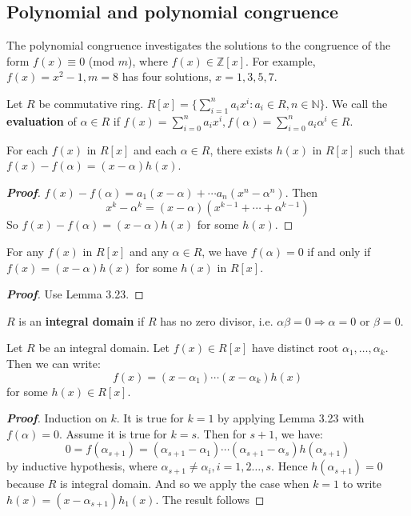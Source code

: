 \subsection{Polynomial and polynomial congruence}
The polynomial congruence investigates the solutions to the congruence of the form $f(x) \equiv 0$ (mod $m$), where $f(x) \in \mathbb{Z}[x]$. For example, $f(x)=x^2-1,m=8$ has four solutions, $x=1,3,5,7$.
\begin{definition} Let $R$ be commutative ring. $R[x]=\{\sum_{i=1}^{n}a_ix^i: a_i \in R, n \in \mathbb{N}\}$. We call the {\bf evaluation} of $\alpha \in R$ if $f(x)=\sum_{i=0}^n a_ix^i, f(\alpha)=\sum_{i=0}^{n}a_i \alpha^i \in R$.
\end{definition}
\begin{lemma} For each $f(x)$ in $R[x]$ and each $\alpha \in R$, there exists $h(x)$ in $R[x]$ such that $f(x)-f(\alpha)=(x-\alpha)h(x)$.
\end{lemma}
\begin{proof}[\bf Proof] $f(x)-f(\alpha)=a_1(x-\alpha)+\cdots a_n(x^n-\alpha^n)$. Then
$$x^k-\alpha^k=(x-\alpha)(x^{k-1} + \cdots +\alpha^{k-1})$$ So $f(x)-f(\alpha)=(x-\alpha)h(x)$ for some $h(x)$.
\end{proof}
\begin{corollary} For any $f(x)$ in $R[x]$ and any $\alpha \in R$, we have $f(\alpha)=0$ if and only if $f(x)=(x-\alpha)h(x)$ for some $h(x)$ in $R[x]$.
\end{corollary}
\begin{proof}[\bf Proof] Use Lemma 3.23.
\end{proof}
\begin{definition} $R$ is an {\bf integral domain} if $R$ has no zero divisor, i.e. $\alpha \beta=0 \Rightarrow \alpha =0$ or $\beta=0$.
\end{definition}
\begin{proposition} Let $R$ be an integral domain. Let $f(x) \in R[x]$ have distinct root $\alpha_1, \ldots, \alpha_k$. Then we can write:
\begin{equation*} f(x)=(x-\alpha_1) \cdots (x-\alpha_k)h(x) \end{equation*}
for some $h(x) \in R[x]$.
\end{proposition}
\begin{proof}[\bf Proof] Induction on $k$. It is true for $k=1$ by applying Lemma 3.23 with $f(\alpha)=0$.
Assume it is true for $k=s$. Then for $s+1$, we have:
\begin{equation*}
0=f(\alpha_{s+1})=(\alpha_{s+1}-\alpha_1) \cdots (\alpha_{s+1} -\alpha_s)h(\alpha_{s+1})
\end{equation*}
by inductive hypothesis, where $\alpha_{s+1} \neq \alpha_i, i=1,2 \ldots, s$. Hence $h(\alpha_{s+1})=0$ because $R$ is integral domain. And so we apply the case when $k=1$ to write $h(x)=(x-\alpha_{s+1})h_1(x)$. The result follows
\end{proof}
